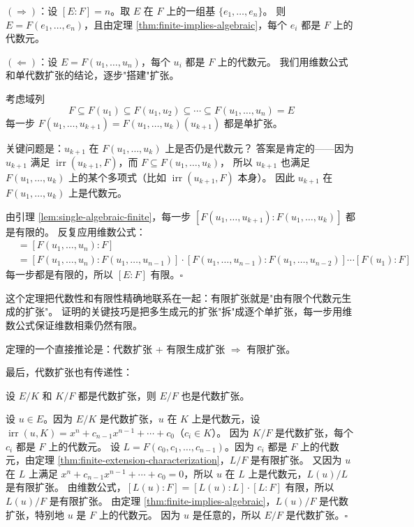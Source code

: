 $(\Rightarrow)$：设 $[E:F] = n$。取 $E$ 在 $F$ 上的一组基 $\{e_1, \ldots, e_n\}$。
则 $E = F(e_1, \ldots, e_n)$，且由定理 \ref{thm:finite-implies-algebraic}，每个 $e_i$ 都是 $F$ 上的代数元。

$(\Leftarrow)$：设 $E = F(u_1, \ldots, u_n)$，每个 $u_i$ 都是 $F$ 上的代数元。
我们用维数公式和单代数扩张的结论，逐步"搭建"扩张。

考虑域列
\[F \subseteq F(u_1) \subseteq F(u_1, u_2) \subseteq \cdots \subseteq F(u_1, \ldots, u_n) = E\]
每一步 $F(u_1, \ldots, u_{k+1}) = F(u_1, \ldots, u_k)(u_{k+1})$ 都是单扩张。

关键问题是：$u_{k+1}$ 在 $F(u_1, \ldots, u_k)$ 上是否仍是代数元？
答案是肯定的——因为 $u_{k+1}$ 满足 $\operatorname{irr}(u_{k+1}, F)$，而 $F \subseteq F(u_1, \ldots, u_k)$，
所以 $u_{k+1}$ 也满足 $F(u_1, \ldots, u_k)$ 上的某个多项式（比如 $\operatorname{irr}(u_{k+1}, F)$ 本身）。
因此 $u_{k+1}$ 在 $F(u_1, \ldots, u_k)$ 上是代数元。

由引理 \ref{lem:single-algebraic-finite}，每一步 $[F(u_1, \ldots, u_{k+1}):F(u_1, \ldots, u_k)]$ 都是有限的。
反复应用维数公式：
\begin{align*}
[E:F] &= [F(u_1, \ldots, u_n):F] \\
      &= [F(u_1, \ldots, u_n):F(u_1, \ldots, u_{n-1})] \cdot [F(u_1, \ldots, u_{n-1}):F(u_1, \ldots, u_{n-2})] \cdots [F(u_1):F]
\end{align*}
每一步都是有限的，所以 $[E:F]$ 有限。$\square$

这个定理把代数性和有限性精确地联系在一起：有限扩张就是"由有限个代数元生成的扩张"。
证明的关键技巧是把多生成元的扩张"拆"成逐个单扩张，每一步用维数公式保证维数相乘仍然有限。

定理的一个直接推论是：代数扩张 + 有限生成扩张 $\Rightarrow$ 有限扩张。

最后，代数扩张也有传递性：

\begin{theorem}[代数扩张的传递性]\label{thm:algebraic-transitive}
设 $E/K$ 和 $K/F$ 都是代数扩张，则 $E/F$ 也是代数扩张。
\end{theorem}

设 $u \in E$。因为 $E/K$ 是代数扩张，$u$ 在 $K$ 上是代数元，设 $\operatorname{irr}(u, K) = x^n + c_{n-1}x^{n-1} + \cdots + c_0$（$c_i \in K$）。
因为 $K/F$ 是代数扩张，每个 $c_i$ 都是 $F$ 上的代数元。
设 $L = F(c_0, c_1, \ldots, c_{n-1})$。因为 $c_i$ 都是 $F$ 上的代数元，由定理 \ref{thm:finite-extension-characterization}，$L/F$ 是有限扩张。
又因为 $u$ 在 $L$ 上满足 $x^n + c_{n-1}x^{n-1} + \cdots + c_0 = 0$，所以 $u$ 在 $L$ 上是代数元，$L(u)/L$ 是有限扩张。
由维数公式，$[L(u):F] = [L(u):L] \cdot [L:F]$ 有限，所以 $L(u)/F$ 是有限扩张。
由定理 \ref{thm:finite-implies-algebraic}，$L(u)/F$ 是代数扩张，特别地 $u$ 是 $F$ 上的代数元。
因为 $u$ 是任意的，所以 $E/F$ 是代数扩张。$\square$

